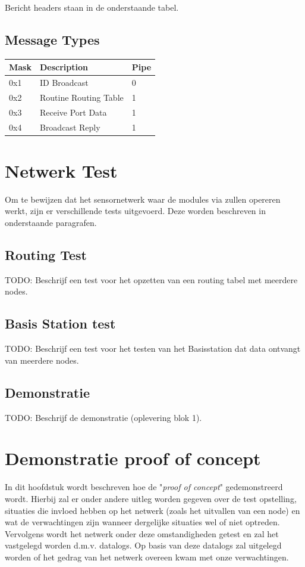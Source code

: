 \documentclass[a4paper, 11pt]{article}
\begin{document}
Bericht headers staan in de onderstaande tabel.

\subsection*{Message Types}
\begin{table}[!ht]
\begin{tabular}{|l|l|l|}
\hline
\rowcolor[HTML]{EFEFEF} 
Mask & Description           & Pipe \\ \hline
0x1  & ID Broadcast          & 0    \\ \hline
0x2  & Routine Routing Table & 1    \\ \hline
0x3  & Receive Port Data     & 1    \\ \hline
0x4  & Broadcast Reply       & 1    \\ \hline
\end{tabular}
\end{table}

\section{Netwerk Test}
Om te bewijzen dat het sensornetwerk waar de modules via zullen opereren werkt, zijn er verschillende tests uitgevoerd. Deze worden beschreven in onderstaande paragrafen.
\subsection{Routing Test}
TODO: Beschrijf een test voor het opzetten van een routing tabel met meerdere nodes.
\subsection{Basis Station test}
TODO: Beschrijf een test voor het testen van het Basisstation dat data ontvangt van meerdere nodes. 
\subsection{Demonstratie}
TODO: Beschrijf de demonstratie (oplevering blok 1).

\section{Demonstratie proof of concept} \label{demonstratie}
In dit hoofdstuk wordt beschreven hoe de "\textit{proof of concept}" gedemonstreerd wordt. Hierbij zal er onder andere uitleg worden gegeven over de test opstelling, situaties die invloed hebben op het netwerk (zoals het uitvallen van een node) en wat de verwachtingen zijn wanneer dergelijke situaties wel of niet optreden. Vervolgens wordt het netwerk onder deze omstandigheden getest en zal het vastgelegd worden d.m.v. datalogs. Op basis van deze datalogs zal uitgelegd worden of het gedrag van het netwerk overeen kwam met onze verwachtingen.
\newpage
\end{document}
